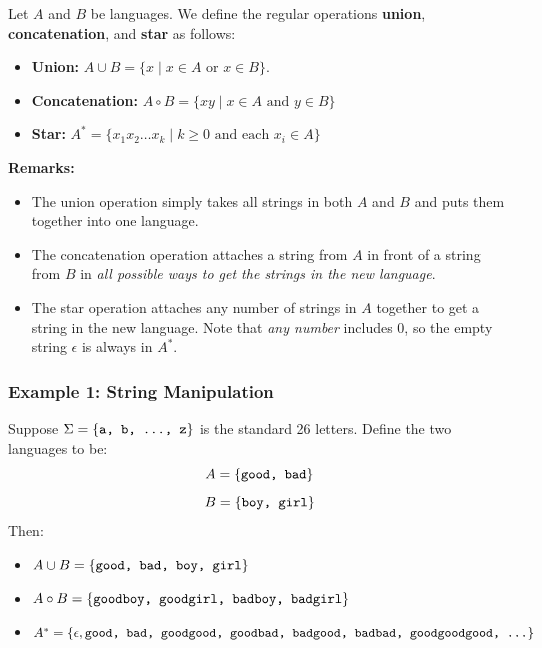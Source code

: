 \documentclass[letterpaper]{article}
\begin{document}
\begin{definition}{}{}
    Let $A$ and $B$ be languages. We define the regular operations \textbf{union}, \textbf{concatenation}, and \textbf{star} as follows: 
    \begin{itemize}
        \item \textbf{Union:} $A \cup B = \{x \mid x \in A \text{ or } x \in B\}$.
        \item \textbf{Concatenation:} $A \circ B = \{xy \mid x \in A \text{ and } y \in B\}$
        \item \textbf{Star:} $A^* = \{x_1 x_2 \dots x_k \mid k \geq 0 \text{ and each } x_i \in A\}$
    \end{itemize}
\end{definition}
\textbf{Remarks:}
\begin{itemize}
    \item The union operation simply takes all strings in both $A$ and $B$ and puts them together into one language.
    \item The concatenation operation attaches a string from $A$ in front of a string from $B$ in \emph{all possible ways to get the strings in the new language}.
    \item The star operation attaches any number of strings in $A$ together to get a string in the new language. Note that \emph{any number} includes 0, so the empty string $\epsilon$ is always in $A^*$.
\end{itemize}

\subsubsection{Example 1: String Manipulation}
Suppose $\Sigma = \{\texttt{a, b, ..., z}\}$ is the standard 26 letters. Define the two languages to be:
\[A = \{\texttt{good, bad}\}\]
\[B = \{\texttt{boy, girl}\}\]
Then: 
\begin{itemize}
    \item $A \cup B = \{\texttt{good, bad, boy, girl}\}$
    \item $A \circ B = \{\texttt{goodboy, goodgirl, badboy, badgirl}\}$
    \item $A^* = \{\epsilon, \texttt{good, bad, goodgood, goodbad, badgood, badbad, goodgoodgood, ...}\}$
\end{itemize}
\end{document}
